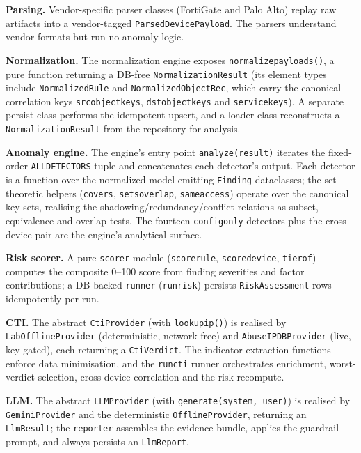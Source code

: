 \documentclass[12pt,a4paper]{report}
\renewcommand{\_}{\textunderscore\allowbreak}
\begin{document}
\textbf{Parsing.} Vendor-specific parser classes (FortiGate and Palo Alto) replay raw artifacts into a vendor-tagged \texttt{ParsedDevicePayload}. The parsers understand vendor formats but run no anomaly logic.

\textbf{Normalization.} The normalization engine exposes \texttt{normalize\_payloads()}, a pure function returning a DB-free \texttt{NormalizationResult} (its element types include \texttt{NormalizedRule} and \texttt{NormalizedObjectRec}, which carry the canonical correlation keys \texttt{src\_object\_keys}, \texttt{dst\_object\_keys} and \texttt{service\_keys}). A separate persist class performs the idempotent upsert, and a loader class reconstructs a \texttt{NormalizationResult} from the repository for analysis.

\textbf{Anomaly engine.} The engine's entry point \texttt{analyze(result)} iterates the fixed-order \texttt{ALL\_DETECTORS} tuple and concatenates each detector's output. Each detector is a function over the normalized model emitting \texttt{Finding} dataclasses; the set-theoretic helpers (\texttt{\_covers}, \texttt{\_sets\_overlap}, \texttt{\_same\_access}) operate over the canonical key sets, realising the shadowing/redundancy/conflict relations as subset, equivalence and overlap tests. The fourteen \texttt{config\_only} detectors plus the cross-device pair are the engine's analytical surface.

\textbf{Risk scorer.} A pure \texttt{scorer} module (\texttt{score\_rule}, \texttt{score\_device}, \texttt{tier\_of}) computes the composite 0--100 score from finding severities and factor contributions; a DB-backed \texttt{runner} (\texttt{run\_risk}) persists \texttt{RiskAssessment} rows idempotently per run.

\textbf{CTI.} The abstract \texttt{CtiProvider} (with \texttt{lookup\_ip()}) is realised by \texttt{LabOfflineProvider} (deterministic, network-free) and \texttt{AbuseIPDBProvider} (live, key-gated), each returning a \texttt{CtiVerdict}. The indicator-extraction functions enforce data minimisation, and the \texttt{run\_cti} runner orchestrates enrichment, worst-verdict selection, cross-device correlation and the risk recompute.

\textbf{LLM.} The abstract \texttt{LLMProvider} (with \texttt{generate(system, user)}) is realised by \texttt{GeminiProvider} and the deterministic \texttt{OfflineProvider}, returning an \texttt{LlmResult}; the \texttt{reporter} assembles the evidence bundle, applies the guardrail prompt, and always persists an \texttt{LlmReport}.
\end{document}
